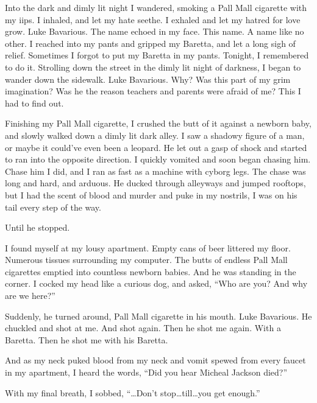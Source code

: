 Into the dark and dimly lit night I wandered, smoking a Pall Mall
cigarette with my iips. I inhaled, and let my hate seethe. I
exhaled and let my hatred for love grow. Luke Bavarious. The name
echoed in my face. This name. A name like no other. I reached into
my pants and gripped my Baretta, and let a long sigh of relief.
Sometimes I forgot to put my Baretta in my pants. Tonight, I
remembered to do it. Strolling down the street in the dimly lit
night of darkness, I began to wander down the sidewalk. Luke
Bavarious. Why? Was this part of my grim imagination? Was he the
reason teachers and parents were afraid of me? This I had to find
out.



Finishing my Pall Mall cigarette, I crushed the butt of it against
a newborn baby, and slowly walked down a dimly lit dark alley. I
saw a shadowy figure of a man, or maybe it could've even been a
leopard. He let out a gasp of shock and started to ran into the
opposite direction. I quickly vomited and soon began chasing him.
Chase him I did, and I ran as fast as a machine with cyborg legs.
The chase was long and hard, and arduous. He ducked through
alleyways and jumped rooftops, but I had the scent of blood and
murder and puke in my nostrils, I was on his tail every step of the
way.



Until he stopped.







I found myself at my lousy apartment. Empty cans of beer littered
my floor. Numerous tissues surrounding my computer. The butts of
endless Pall Mall cigarettes emptied into countless newborn babies.
And he was standing in the corner. I cocked my head like a curious
dog, and asked, ``Who are you? And why are we here?''



Suddenly, he turned around, Pall Mall cigarette in his mouth. Luke
Bavarious. He chuckled and shot at me. And shot again. Then he shot
me again. With a Baretta. Then he shot me with his Baretta.



And as my neck puked blood from my neck and vomit spewed from every
faucet in my apartment, I heard the words, ``Did you hear Micheal
Jackson died?''



With my final breath, I sobbed, ``{\ldots}Don't stop{\ldots}till{\ldots}you get
enough.'' 
 




